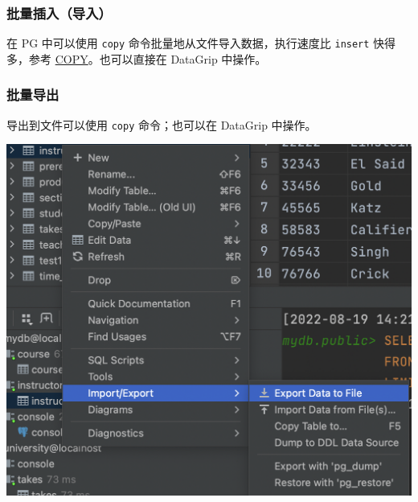\documentclass[aspectratio=169, 14pt]{beamer}
\begin{document}
\begin{frame}
    \frametitle{批量插入（导入）}

    {\Huge {}  }

在 PG 中可以使用 \texttt{copy} 命令批量地从文件导入数据，执行速度比 \texttt{insert} 快得多，参考 \href{https://www.postgresql.org/docs/14/sql-copy.html}{COPY}。也可以直接在 DataGrip 中操作。

\end{frame}

\begin{frame}
    \frametitle{批量导出}
导出到文件可以使用 \texttt{copy} 命令；也可以在 DataGrip 中操作。

\begin{center}
    \includegraphics[height=.7\paperheight]{week6/export}
\end{center}

\end{frame}
\end{document}
